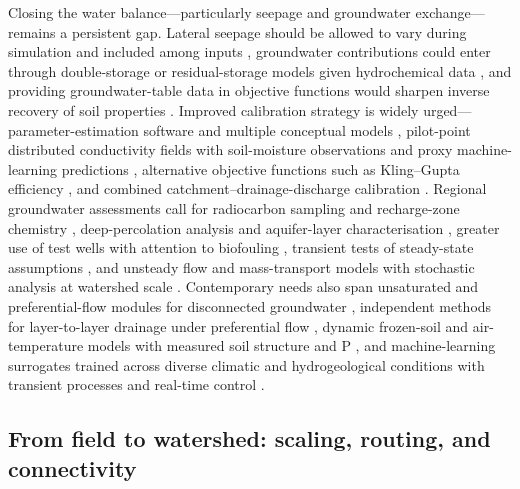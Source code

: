 Closing the water balance---particularly seepage and groundwater exchange---
remains a persistent gap. Lateral seepage should be allowed to vary during
simulation and included among inputs \parencite{Feng2018}, groundwater
contributions could enter through double-storage or residual-storage models
given hydrochemical data \parencite{DaneshYazdi2016}, and providing
groundwater-table data in objective functions would sharpen inverse recovery of
soil properties \parencite{Sedaghatdoost2018,Sedaghatdoost2019}. Improved
calibration strategy is widely urged---parameter-estimation software and
multiple conceptual models \parencite{Boico2022}, pilot-point distributed
conductivity fields with soil-moisture observations and proxy machine-learning
predictions \parencite{Schneider2022}, alternative objective functions such as
Kling--Gupta efficiency \parencite{Brighenti2023}, and combined
catchment--drainage-discharge calibration \parencite{DeSchepper2017}. Regional
groundwater assessments call for radiocarbon sampling and recharge-zone chemistry
\parencite{Tweed2018,Dragon2016}, deep-percolation analysis and aquifer-layer
characterisation \parencite{BOOKMAN1959,KAMRA1991,KAMRA1994}, greater use of
test wells with attention to biofouling \parencite{Stuetz2004}, transient tests
of steady-state assumptions \parencite{Schilling2022}, and unsteady flow and
mass-transport models with stochastic analysis at watershed scale
\parencite{Gates2002,Burkhalter2006}. Contemporary needs also span unsaturated
and preferential-flow modules for disconnected groundwater
\parencite{Kompanizare2024}, independent methods for layer-to-layer drainage
under preferential flow \parencite{Ojeda2018}, dynamic frozen-soil and
air-temperature models with measured soil structure and P \parencite{Ulén2016},
and machine-learning surrogates trained across diverse climatic and
hydrogeological conditions with transient processes and real-time control
\parencite{Lei2026}.

\subsection{From field to watershed: scaling, routing, and connectivity}

